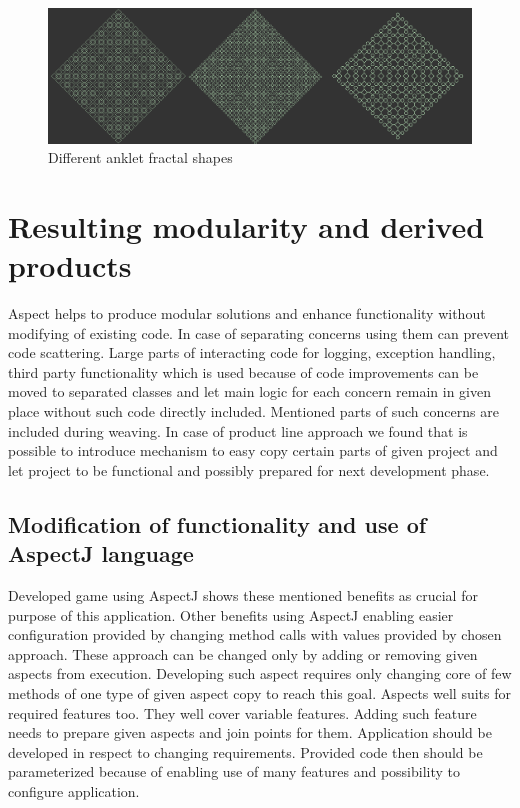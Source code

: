\documentclass[11pt,slovak,a4paper,twoside]{article}
\begin{document}
\begin{figure}[H]  %
					\begin{center}
									\includegraphics[width=\linewidth]{fig/fractalsAnklet.png}
									\caption{Different anklet fractal shapes}
									\label{ankletFractalTypes}
					\end{center}
\end{figure}



\section{Resulting modularity and derived products} \label{resultingModularity}

Aspect helps to produce modular solutions and enhance functionality without modifying of existing code. In case of separating concerns using them can prevent code scattering. Large parts of interacting code for logging, exception handling, third party functionality which is used because of code improvements can be moved to separated classes and let main logic for each concern remain in given place without such code directly included. Mentioned parts of such concerns are included during weaving. In case of product line approach we found that is possible to introduce mechanism to easy copy certain parts of given project and let project to be functional and possibly prepared for next development phase. 


\subsection{Modification of functionality and use of AspectJ language} \label{functionalityModiffication}

Developed game using AspectJ shows these mentioned benefits as crucial for purpose of this application. Other benefits using AspectJ enabling easier configuration provided by changing method calls with values provided by chosen approach. These approach can be changed only by adding or removing given aspects from execution. Developing such aspect requires only changing core of few methods of one type of given aspect copy to reach this goal. Aspects well suits for required features too. They well cover variable features. Adding such feature needs to prepare given aspects and join points for them. Application should be developed in respect to changing requirements. Provided code then should be parameterized because of enabling use of many features and possibility to configure application.
\end{document}
